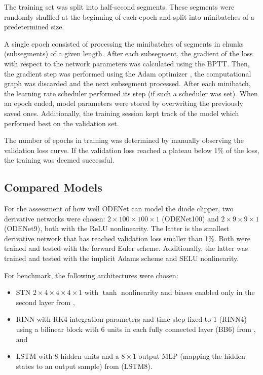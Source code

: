 The training set was split into half-second segments. These segments were randomly shuffled at the beginning of each epoch and split into minibatches of a predetermined size.

A single epoch consisted of processing the minibatches of segments in chunks (subsegments) of a given length. After each subsegment, the gradient of the loss with respect to the network parameters was calculated using the \ac{BPTT}. Then, the gradient step was performed using the Adam optimizer \cite{Kingma2017}, the computational graph was discarded and the next subsegment processed. After each minibatch, the learning rate scheduler performed its step (if such a scheduler was set). When an epoch ended, model parameters were stored by overwriting the previously saved ones. Additionally, the training session kept track of the model which performed best on the validation set.

The number of epochs in training was determined by manually observing the validation loss curve. If the validation loss reached a plateau below 1\% of the loss, the training was deemed successful.

\subsection{Compared Models}
\label{sec:diode_clipper_models}

For the assessment of how well ODENet can model the diode clipper, two derivative networks were chosen: $2 \times 100 \times 100 \times 1$ (ODENet100) and $2 \times 9 \times 9 \times 1$ (ODENet9), both with the \ac{ReLU} nonlinearity. The latter is the smallest derivative network that has reached validation loss smaller than 1\%. Both were trained and tested with the forward Euler scheme. Additionally, the latter was trained and tested with the implicit Adams scheme and \ac{SELU} nonlinearity.

For benchmark, the following architectures were chosen:
\begin{itemize}
    \item \ac{STN} $2 \times 4 \times 4 \times 4 \times 1$ with $\tanh$ nonlinearity and biases enabled only in the second layer from \cite{Parker2019}, 
    \item \ac{RINN} with \ac{RK}4 integration parameters and time step fixed to 1 (\ac{RINN}4) using a bilinear block with 6 units in each fully connected layer (BB6) from \cite{Ouala2019}, and 
    \item \ac{LSTM} with 8 hidden units and a $8 \times 1$ output \ac{MLP} (mapping the hidden states to an output sample) from \cite{Wright2019} (\ac{LSTM}8).
\end{itemize}

